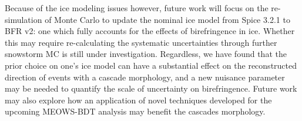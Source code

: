 \documentclass[main.tex]{subfiles}
\begin{document}
Because of the ice modeling issues however, future work will focus on the re-simulation of Monte Carlo to update the nominal ice model from Spice 3.2.1 to BFR v2: one which fully accounts for the effects of birefringence in ice.
Whether this may require re-calculating the systematic uncertainties through further snowstorm MC  is still under investigation. 
Regardless, we have found that the prior choice on one's ice model can have a substantial effect on the reconstructed direction of events with a cascade morphology, and a new nuisance parameter may be needed to quantify the scale of uncertainty on birefringence.
Future work may also explore how an application of novel techniques developed for the upcoming MEOWS-BDT analysis may benefit the cascades morphology. 
\end{document}
